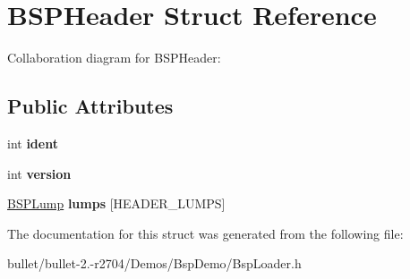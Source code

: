 \hypertarget{struct_b_s_p_header}{\section{B\+S\+P\+Header Struct Reference}
\label{struct_b_s_p_header}
}


Collaboration diagram for B\+S\+P\+Header\+:
\subsection*{Public Attributes}
\begin{DoxyCompactItemize}
\item 
\hypertarget{struct_b_s_p_header_a27f336f12e362c01203e5247349c1ed3}{int {\bfseries ident}}\label{struct_b_s_p_header_a27f336f12e362c01203e5247349c1ed3}

\item 
\hypertarget{struct_b_s_p_header_a5724db14889cb2faab89de4bfd430eb6}{int {\bfseries version}}\label{struct_b_s_p_header_a5724db14889cb2faab89de4bfd430eb6}

\item 
\hypertarget{struct_b_s_p_header_a719eca00f6c4f27f0b1dd985a85f48b8}{\hyperlink{struct_b_s_p_lump}{B\+S\+P\+Lump} {\bfseries lumps} \mbox{[}H\+E\+A\+D\+E\+R\+\_\+\+L\+U\+M\+P\+S\mbox{]}}\label{struct_b_s_p_header_a719eca00f6c4f27f0b1dd985a85f48b8}

\end{DoxyCompactItemize}


The documentation for this struct was generated from the following file\+:\begin{DoxyCompactItemize}
\item 
bullet/bullet-\/2.-\/r2704/\+Demos/\+Bsp\+Demo/Bsp\+Loader.\+h\end{DoxyCompactItemize}
